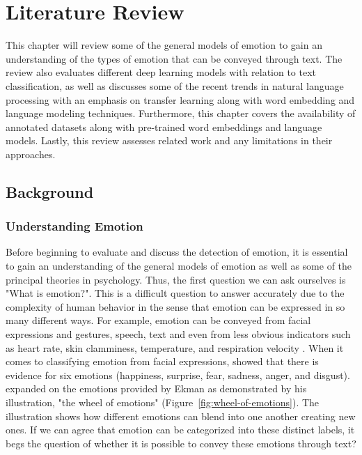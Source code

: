 \chapter{Literature Review}\label{ch:litReview}

This chapter will review some of the general models of emotion to gain an understanding of the types of emotion that can be conveyed through text. The review also evaluates different deep learning models with relation to text classification, as well as discusses some of the recent trends in natural language processing with an emphasis on transfer learning along with word embedding and language modeling techniques. Furthermore, this chapter covers the availability of annotated datasets along with pre-trained word embeddings and language models. Lastly, this review assesses related work and any limitations in their approaches. 

\section{Background}

\subsection{Understanding Emotion}

Before beginning to evaluate and discuss the detection of emotion, it is essential to gain an understanding of the general models of emotion as well as some of the principal theories in psychology. Thus, the first question we can ask ourselves is "What is emotion?". This is a difficult question to answer accurately due to the complexity of human behavior in the sense that emotion can be expressed in so many different ways. For example, emotion can be conveyed from facial expressions and gestures, speech, text and even from less obvious indicators such as heart rate, skin clamminess, temperature, and respiration velocity \citep{pdf:MajaPantic}. When it comes to classifying emotion from facial expressions, \citep{pdf:PaulEkmanEmotions} showed that there is evidence for six emotions (happiness, surprise, fear, sadness, anger, and disgust). \citep{plutchik1980general} expanded on the emotions provided by Ekman as demonstrated by his illustration, "the wheel of emotions" (Figure~\ref{fig:wheel-of-emotions}). The illustration shows how different emotions can blend into one another creating new ones. If we can agree that emotion can be categorized into these distinct labels, it begs the question of whether it is possible to convey these emotions through text?

